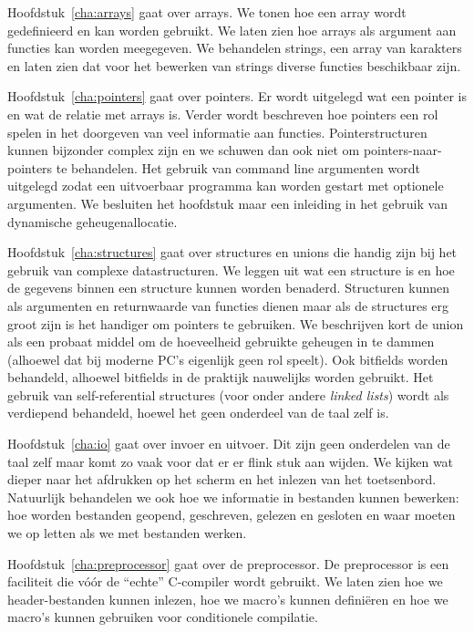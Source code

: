 Hoofdstuk~\ref{cha:arrays} gaat over arrays. We tonen hoe een array wordt gedefinieerd en kan worden gebruikt. We laten zien hoe arrays als argument aan functies kan worden meegegeven. We behandelen strings, een array van karakters en laten zien dat voor het bewerken van strings diverse functies beschikbaar zijn.

Hoofdstuk~\ref{cha:pointers} gaat over pointers. Er wordt uitgelegd wat een pointer is en wat de relatie met arrays is. Verder wordt beschreven hoe pointers een rol spelen in het doorgeven van veel informatie aan functies. Pointerstructuren kunnen bijzonder complex zijn en we schuwen dan ook niet om pointers-naar-pointers te behandelen. Het gebruik van command line argumenten wordt uitgelegd zodat een uitvoerbaar programma kan worden gestart met optionele argumenten. We besluiten het hoofdstuk maar een inleiding in het gebruik van dynamische geheugenallocatie.

Hoofdstuk~\ref{cha:structures} gaat over structures en unions die handig zijn bij het gebruik van complexe datastructuren. We leggen uit wat een structure is en hoe de gegevens binnen een structure kunnen worden benaderd. Structuren kunnen als argumenten en returnwaarde van functies dienen maar als de structures erg groot zijn is het handiger om pointers te gebruiken. We beschrijven kort de union als een probaat middel om de hoeveelheid gebruikte geheugen in te dammen (alhoewel dat bij moderne PC's eigenlijk geen rol speelt). Ook bitfields worden behandeld, alhoewel bitfields in de praktijk nauwelijks worden gebruikt. Het gebruik van self-referential structures (voor onder andere \textsl{linked lists}) wordt als verdiepend behandeld, hoewel het geen onderdeel van de taal zelf is.

Hoofdstuk~\ref{cha:io} gaat over invoer en uitvoer. Dit zijn geen onderdelen van de taal zelf maar komt zo vaak voor dat er er flink stuk aan wijden. We kijken wat dieper naar het afdrukken op het scherm en het inlezen van het toetsenbord. Natuurlijk behandelen we ook hoe we informatie in bestanden kunnen bewerken: hoe worden bestanden geopend, geschreven, gelezen en gesloten en waar moeten we op letten als we met bestanden werken.

Hoofdstuk~\ref{cha:preprocessor} gaat over de preprocessor. De preprocessor is een faciliteit die vóór de ``echte'' C-compiler wordt gebruikt. We laten zien hoe we header-bestanden kunnen inlezen, hoe we macro's kunnen definiëren en hoe we macro's kunnen gebruiken voor conditionele compilatie.


